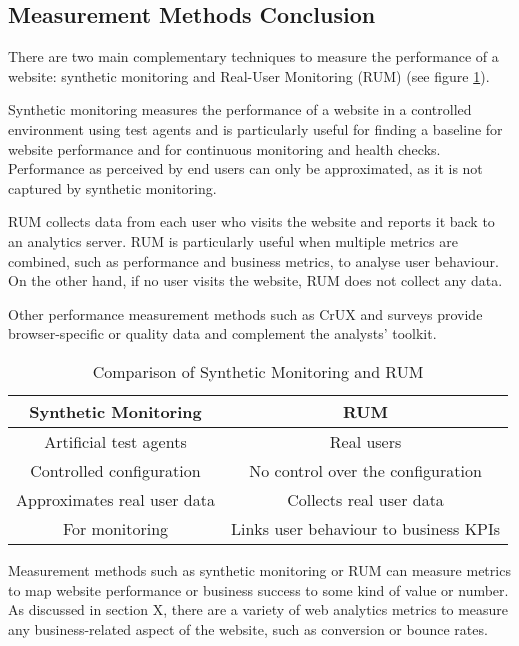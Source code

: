 
\subsection{Measurement Methods Conclusion} %

There are two main complementary techniques to measure the performance of a website: synthetic monitoring and Real-User Monitoring (RUM) (see figure \ref{table:synthetic_monitoring_rum_comparison}).

Synthetic monitoring measures the performance of a website in a controlled environment using test agents and is particularly useful for finding a baseline for website performance and for continuous monitoring and health checks.
Performance as perceived by end users can only be approximated, as it is not captured by synthetic monitoring.

RUM collects data from each user who visits the website and reports it back to an analytics server.
RUM is particularly useful when multiple metrics are combined, such as performance and business metrics, to analyse user behaviour.
On the other hand, if no user visits the website, RUM does not collect any data.

Other performance measurement methods such as CrUX and surveys provide browser-specific or quality data and complement the analysts' toolkit.

\begin{table}[h]
	\small
	\centering
	\begin{tabular}{ | c | c | }
	\hline
	Synthetic Monitoring \cellcolor{lightgrey} & RUM \cellcolor{lightgrey} \\
	\hline
	Artificial test agents & Real users \\
	\hline
	Controlled configuration & No control over the configuration \\
	\hline
	Approximates real user data & Collects real user data \\
	\hline
	For monitoring & Links user behaviour to business KPIs \\
	\hline
	\end{tabular}
	\medskip
	\caption{Comparison of Synthetic Monitoring and RUM}
	\label{table:synthetic_monitoring_rum_comparison}
\end{table}


Measurement methods such as synthetic monitoring or RUM can measure metrics to map website performance or business success to some kind of value or number.
As discussed in section X, there are a variety of web analytics metrics to measure any business-related aspect of the website, such as conversion or bounce rates.

